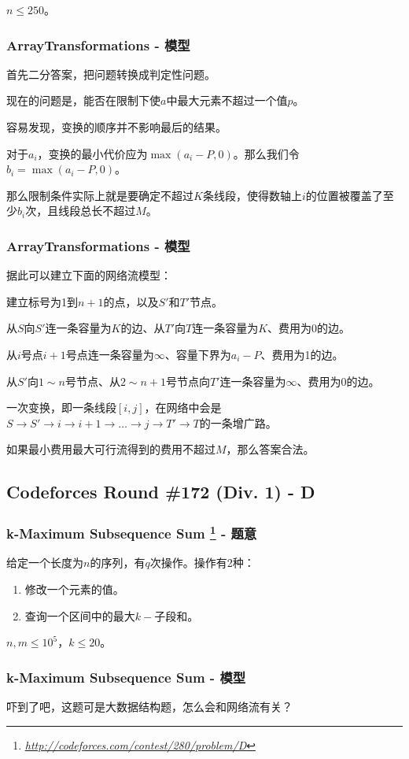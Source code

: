 \documentclass[11pt,dvipsnames,table]{beamer}
\newcommand{\hlink}[1]{
	\footnote{\fontsize{6pt}{\baselineskip}\href{#1}{\textsl{\underline{#1}}}}
}
\begin{document}
{\begin{frame}
	$n\leq 250$。
\end{frame}
\begin{frame}
	\frametitle{ArrayTransformations - 模型}
	首先二分答案，把问题转换成判定性问题。
	
	现在的问题是，能否在限制下使$a$中最大元素不超过一个值$p$。\pause
	
	容易发现，变换的顺序并不影响最后的结果。
	
	对于$a_i$，变换的最小代价应为$\max(a_i-P,0)$。那么我们令$b_i=\max(a_i-P,0)$。
	
	那么限制条件实际上就是要确定不超过$K$条线段，使得数轴上$i$的位置被覆盖了至少$b_i$次，且线段总长不超过$M$。
\end{frame}
\begin{frame}
	\frametitle{ArrayTransformations - 模型}
	据此可以建立下面的网络流模型：
	
	建立标号为1到$n+1$的点，以及$S'$和$T'$节点。
	
	从$S$向$S'$连一条容量为$K$的边、从$T'$向$T$连一条容量为$K$、费用为0的边。
	
	从$i$号点$i+1$号点连一条容量为$\infty$、容量下界为$a_i-P$、费用为1的边。
	
	从$S'$向$1\sim n$号节点、从$2\sim n+1$号节点向$T'$连一条容量为$\infty$、费用为0的边。
	
	一次变换，即一条线段$[i,j]$，在网络中会是$S\rightarrow S'\rightarrow i\rightarrow i+1\rightarrow \ldots\rightarrow j\rightarrow T'\rightarrow T$的一条增广路。
	
	如果最小费用最大可行流得到的费用不超过$M$，那么答案合法。
\end{frame}

\subsection{Codeforces Round \#172 (Div. 1) - D}
\begin{frame}
	\frametitle{k-Maximum Subsequence Sum\hlink{http://codeforces.com/contest/280/problem/D} - 题意}
	给定一个长度为$n$的序列，有$q$次操作。操作有2种：
	\begin{enumerate}
		\item 修改一个元素的值。
		\item 查询一个区间中的最大$k-$子段和。
	\end{enumerate}
	$n,m\leq 10^5$，$k\leq 20$。
\end{frame}
\begin{frame}
	\frametitle{k-Maximum Subsequence Sum - 模型}
	吓到了吧，这题可是大数据结构题，怎么会和网络流有关？
	

\end{frame}}
\end{document}
